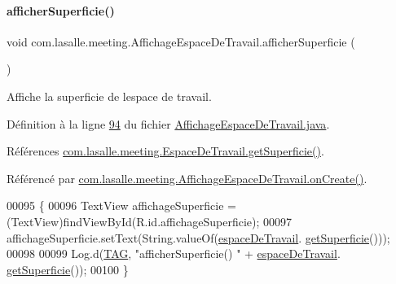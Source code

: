 \paragraph{\texorpdfstring{afficher\+Superficie()}{afficherSuperficie()}}
{\footnotesize\ttfamily void com.\+lasalle.\+meeting.\+Affichage\+Espace\+De\+Travail.\+afficher\+Superficie (\begin{DoxyParamCaption}{ }\end{DoxyParamCaption})}



Affiche la superficie de l\textquotesingle{}espace de travail. 



Définition à la ligne \hyperlink{_affichage_espace_de_travail_8java_source_l00094}{94} du fichier \hyperlink{_affichage_espace_de_travail_8java_source}{Affichage\+Espace\+De\+Travail.\+java}.



Références \hyperlink{_espace_de_travail_8java_source_l00102}{com.\+lasalle.\+meeting.\+Espace\+De\+Travail.\+get\+Superficie()}.



Référencé par \hyperlink{_affichage_espace_de_travail_8java_source_l00041}{com.\+lasalle.\+meeting.\+Affichage\+Espace\+De\+Travail.\+on\+Create()}.


\begin{DoxyCode}
00095     \{
00096         TextView affichageSuperficie = (TextView)findViewById(R.id.affichageSuperficie);
00097         affichageSuperficie.setText(String.valueOf(\hyperlink{classcom_1_1lasalle_1_1meeting_1_1_affichage_espace_de_travail_a934d41c1c41882b94b65a95cee5aca13}{espaceDeTravail}.
      \hyperlink{classcom_1_1lasalle_1_1meeting_1_1_espace_de_travail_ae2c734da9d454b368ddb056b1cdae499}{getSuperficie}()));
00098 
00099         Log.d(\hyperlink{classcom_1_1lasalle_1_1meeting_1_1_affichage_espace_de_travail_a8606eb11c7b28f52226544de431d86a4}{TAG}, \textcolor{stringliteral}{"afficherSuperficie() "} + \hyperlink{classcom_1_1lasalle_1_1meeting_1_1_affichage_espace_de_travail_a934d41c1c41882b94b65a95cee5aca13}{espaceDeTravail}.
      \hyperlink{classcom_1_1lasalle_1_1meeting_1_1_espace_de_travail_ae2c734da9d454b368ddb056b1cdae499}{getSuperficie}());
00100     \}
\end{DoxyCode}
\mbox{\label{classcom_1_1lasalle_1_1meeting_1_1_affichage_espace_de_travail_a9474bdc380c78e632cc8d384d7393f50}} 
